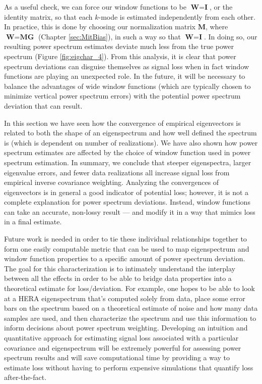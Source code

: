 As a useful check, we can force our window functions to be $\textbf{W} = \textbf{I}$, or the identity matrix, so that each $k$-mode is estimated independently from each other. In practice, this is done by choosing our normalization matrix $\textbf{M}$, where $\textbf{W} = \textbf{M}\textbf{G}$ (Chapter \ref{sec:MitBias}), in such a way so that $\textbf{W} = \textbf{I}$. In doing so, our resulting power spectrum estimates deviate much less from the true power spectrum (Figure \ref{fig:eigchar_4}). From this analysis, it is clear that power spectrum deviations can disguise themselves as signal loss when in fact window functions are playing an unexpected role. In the future, it will be necessary to balance the advantages of wide window functions (which are typically chosen to minimize vertical power spectrum errors) with the potential power spectrum deviation that can result.

In this section we have seen how the convergence of empirical eigenvectors is related to both the shape of an eigenspectrum and how well defined the spectrum is (which is dependent on number of realizations). We have also shown how power spectrum estimates are affected by the choice of window function used in power spectrum estimation. In summary, we conclude that steeper eigenspectra, larger eigenvalue errors, and fewer data realizations all increase signal loss from empirical inverse covariance weighting. Analyzing the convergences of eigenvectors is in general a good indicator of potential loss; however, it is not a complete explanation for power spectrum deviations. Instead, window functions can take an accurate, non-lossy result --- and modify it in a way that mimics loss in a final estimate. 

Future work is needed in order to tie these individual relationships together to form one easily computable metric that can be used to map eigenspectrum and window function properties to a specific amount of power spectrum deviation. The goal for this characterization is to intimately understand the interplay between all the effects in order to be able to bridge data properties into a theoretical estimate for loss/deviation. For example, one hopes to be able to look at a HERA eigenspectrum that's computed solely from data, place some error bars on the spectrum based on a theoretical estimate of noise and how many data samples are used, and then characterize the spectrum and use this information to inform decisions about power spectrum weighting. Developing an intuition and quantitative approach for estimating signal loss associated with a particular covariance and eigenspectrum will be extremely powerful for assessing power spectrum results and will save computational time by providing a way to estimate loss without having to perform expensive simulations that quantify loss after-the-fact. 

